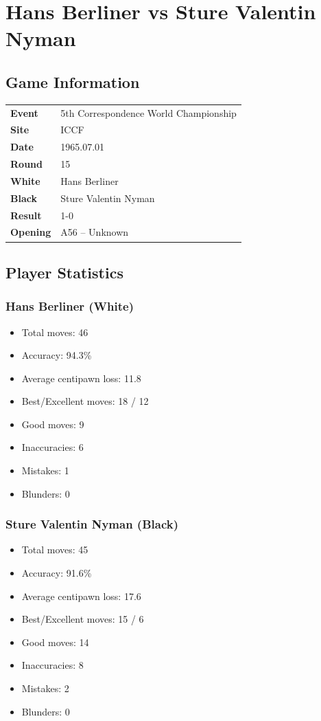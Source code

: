 \documentclass[11pt]{book}
\begin{document}
\chapter{Hans Berliner vs Sture Valentin Nyman}

\section{Game Information}
\begin{tabular}{ll}
\textbf{Event} & 5th Correspondence World Championship \\
\textbf{Site} & ICCF \\
\textbf{Date} & 1965.07.01 \\
\textbf{Round} & 15 \\
\textbf{White} & Hans Berliner \\
\textbf{Black} & Sture Valentin Nyman \\
\textbf{Result} & 1-0 \\
\textbf{Opening} & A56 -- Unknown \\
\end{tabular}

\section{Player Statistics}

\subsection{Hans Berliner (White)}
\begin{itemize}
\item Total moves: 46
\item Accuracy: 94.3\%
\item Average centipawn loss: 11.8
\item Best/Excellent moves: 18 / 12
\item Good moves: 9
\item Inaccuracies: 6
\item Mistakes: 1
\item Blunders: 0
\end{itemize}

\subsection{Sture Valentin Nyman (Black)}
\begin{itemize}
\item Total moves: 45
\item Accuracy: 91.6\%
\item Average centipawn loss: 17.6
\item Best/Excellent moves: 15 / 6
\item Good moves: 14
\item Inaccuracies: 8
\item Mistakes: 2
\item Blunders: 0
\end{itemize}
\end{document}

